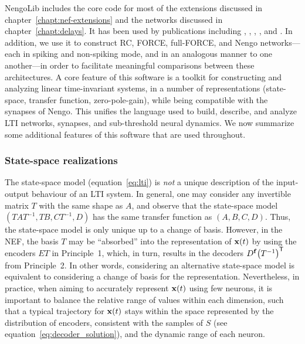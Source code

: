 
NengoLib includes the core code for most of the extensions discussed in chapter~\ref{chapt:nef-extensions} and the networks discussed in chapter~\ref{chapt:delays}.
It has been used by publications including
\citet{knight2016}, \citet{voelker2016a}, \citet{voelker2017iscas}, \citet{voelker2017neuromorphic}, and \citet{voelker2018}.
In addition, we use it to construct RC, FORCE, full-FORCE, and Nengo networks---each in spiking and non-spiking mode, and in an analogous manner to one another---in order to facilitate meaningful comparisons between these architectures.
A core feature of this software is a toolkit for constructing and analyzing linear time-invariant systems, in a number of representations (state-space, transfer function, zero-pole-gain), while being compatible with the synapses of Nengo.
This unifies the language used to build, describe, and analyze LTI networks, synapses, and sub-threshold neural dynamics.
We now summarize some additional features of this software that are used throughout.

\subsubsection{State-space realizations}

The state-space model (equation~\ref{eq:lti}) is \emph{not} a unique description of the input-output behaviour of an LTI system.
In general, one may consider any invertible matrix $T$ with the same shape as $A$, and observe that the state-space model $(TAT^{-1}\text{,}\, TB\text{,}\, CT^{-1}\text{,}\, D)$ has the same transfer function as $(A\text{,}\, B\text{,}\, C\text{,}\, D)$.
Thus, the state-space model is only unique up to a change of basis.
However, in the NEF, the basis $T$ may be ``absorbed'' into the representation of $\mathbf{x}(t)$ by using the encoders $ET$ in Principle~1, which, in turn, results in the decoders $D^{\mathbf{f}} {\left(T^{-1}\right)}^\mathsf{T}$ from Principle~2.
In other words, considering an alternative state-space model is equivalent to considering a change of basis for the representation.
Nevertheless, in practice, when aiming to accurately represent $\mathbf{x}(t)$ using few neurons, it is important to balance the relative range of values within each dimension, such that a typical trajectory for $\mathbf{x}(t)$ stays within the space represented by the distribution of encoders, consistent with the samples of $S$ (see equation~\ref{eq:decoder_solution}), and the dynamic range of each neuron.

